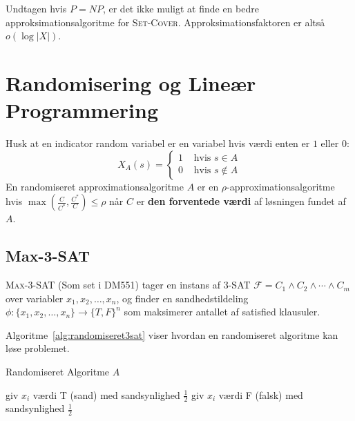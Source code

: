 Undtagen hvis $P = NP$, er det ikke muligt at finde en bedre approksimationsalgoritme for \textsc{Set-Cover}. Approksimationsfaktoren er altså $o(\log |X|)$.

\section{Randomisering og Lineær Programmering}%
\label{sec:randomizationandlp}

Husk at en indicator random variabel er en variabel hvis værdi enten er $1$ eller $0$:
\begin{equation*}
	X_{A}(s) = \begin{cases}
		1 & \text{ hvis } s \in A    \\
		0 & \text{ hvis } s \notin A
	\end{cases}
\end{equation*}
En randomiseret approximationsalgoritme $A$ er en \(\rho\)-approximationsalgoritme hvis $\max \left( \frac{C}{C^{*}}, \frac{C^{*}}{C} \right) \le \rho$ når $C$ er \textbf{den forventede værdi} af løsningen fundet af $A$.

\subsection{Max-3-SAT}%
\label{subsec:label}

\textsc{Max-3-SAT} (Som set i DM551) tager en instans af \textsc{3-SAT} $\mathcal{F} = C_{1} \wedge C_{2} \wedge \cdots \wedge C_{m}$ over variabler $x_{1}, x_{2}, \ldots, x_{n}$, og finder en sandhedstildeling $\phi : \{x_{1}, x_{2}, \ldots, x_{n}\} \rightarrow \{T, F\}^{n}$ som maksimerer antallet af satisfied klausuler.

Algoritme~\ref{alg:randomiseret3sat} viser hvordan en randomiseret algoritme kan løse problemet.
\begin{algorithm}
	\caption{\label{alg:randomiseret3sat}Randomiseret Algoritme $A$}
	\begin{algorithmic}[1]
		\STATE giv $x_i$ værdi T (sand) med sandsynlighed $\frac{1}{2}$
		\STATE giv $x_{i}$ værdi F (falsk) med sandsynlighed $\frac{1}{2}$
		\ENDFOR
	\end{algorithmic}
\end{algorithm}

